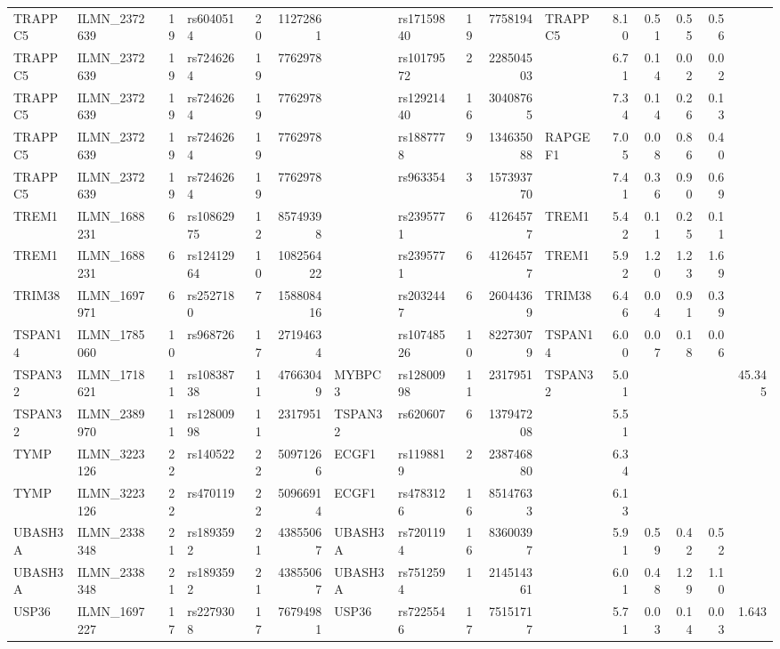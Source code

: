 \documentclass{article}
\begin{document}
\begin{landscape}
{\begin{ThreePartTable}
\begin{longtable}{|llr|lrrl|lrrl|rrrr|r|}
  TRAPPC5 & ILMN\_2372639 & 19 & rs6040514 & 20 & 11272861 &  & rs17159840 & 19 & 7758194 & TRAPPC5 & 8.10 & 0.51 & 0.55 & 0.56 &  \\
  TRAPPC5 & ILMN\_2372639 & 19 & rs7246264 & 19 & 7762978 &  & rs10179572 & 2 & 228504503 &  & 6.71 & 0.14 & 0.02 & 0.02 &  \\
  TRAPPC5 & ILMN\_2372639 & 19 & rs7246264 & 19 & 7762978 &  & rs12921440 & 16 & 30408765 &  & 7.34 & 0.14 & 0.26 & 0.13 &  \\
  TRAPPC5 & ILMN\_2372639 & 19 & rs7246264 & 19 & 7762978 &  & rs1887778 & 9 & 134635088 & RAPGEF1 & 7.05 & 0.08 & 0.86 & 0.40 &  \\
  TRAPPC5 & ILMN\_2372639 & 19 & rs7246264 & 19 & 7762978 &  & rs963354 & 3 & 157393770 &  & 7.41 & 0.36 & 0.90 & 0.69 &  \\
  TREM1 & ILMN\_1688231 & 6 & rs10862975 & 12 & 85749398 &  & rs2395771 & 6 & 41264577 & TREM1 & 5.42 & 0.11 & 0.25 & 0.11 &  \\
  TREM1 & ILMN\_1688231 & 6 & rs12412964 & 10 & 108256422 &  & rs2395771 & 6 & 41264577 & TREM1 & 5.92 & 1.20 & 1.23 & 1.69 &  \\
  TRIM38 & ILMN\_1697971 & 6 & rs2527180 & 7 & 158808416 &  & rs2032447 & 6 & 26044369 & TRIM38 & 6.46 & 0.04 & 0.91 & 0.39 &  \\
  TSPAN14 & ILMN\_1785060 & 10 & rs968726 & 17 & 27194634 &  & rs10748526 & 10 & 82273079 & TSPAN14 & 6.00 & 0.07 & 0.18 & 0.06 &  \\
  TSPAN32 & ILMN\_1718621 & 11 & rs10838738 & 11 & 47663049 & MYBPC3 & rs12800998 & 11 & 2317951 & TSPAN32 & 5.01 &  &  &  & 45.345 \\
  TSPAN32 & ILMN\_2389970 & 11 & rs12800998 & 11 & 2317951 & TSPAN32 & rs620607 & 6 & 137947208 &  & 5.51 &  &  &  &  \\
  TYMP & ILMN\_3223126 & 22 & rs140522 & 22 & 50971266 & ECGF1 & rs1198819 & 2 & 238746880 &  & 6.34 &  &  &  &  \\
  TYMP & ILMN\_3223126 & 22 & rs470119 & 22 & 50966914 & ECGF1 & rs4783126 & 16 & 85147633 &  & 6.13 &  &  &  &  \\
  UBASH3A & ILMN\_2338348 & 21 & rs1893592 & 21 & 43855067 & UBASH3A & rs7201194 & 16 & 83600397 &  & 5.91 & 0.59 & 0.42 & 0.52 &  \\
  UBASH3A & ILMN\_2338348 & 21 & rs1893592 & 21 & 43855067 & UBASH3A & rs7512594 & 1 & 214514361 &  & 6.01 & 0.48 & 1.29 & 1.10 &  \\
  USP36 & ILMN\_1697227 & 17 & rs2279308 & 17 & 76794981 & USP36 & rs7225546 & 17 & 75151717 &  & 5.71 & 0.03 & 0.14 & 0.03 & 1.643 \\

\end{longtable}
\end{ThreePartTable}}
\end{landscape}
\end{document}
